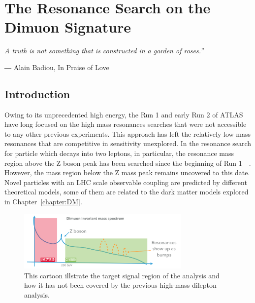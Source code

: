 \chapter{The Resonance Search on the Dimuon Signature}
\label{chapter:dimuon}

\epigraph{\textit{A truth is not something that is constructed in a garden of roses.” }}{― Alain Badiou, In Praise of Love}


\section{Introduction}

Owing to its unprecedented high energy, the Run 1 and early Run 2 of ATLAS have long focused on the high mass resonances searches that were not accessible to any other previous experiments. This approach has left the relatively low mass resonances that are competitive in sensitivity unexplored. In the resonance search for particle which decays into two leptons, in particular, the resonance mass region above the Z boson peak has been searched since the beginning of Run
1~\cite{Aaboud:2273892}~\cite{Dilepton2019}. However, the mass region below the Z mass peak remains uncovered to this date. Novel particles with an LHC scale observable coupling are predicted by different theoretical models, some of them are related to the dark matter models explored in Chapter~\ref{chapter:DM}.

\begin{figure}[!htb]
    \begin{center}
        \includegraphics[width=0.75\textwidth]{figures/chapter_dimuon/dimuonStudies}        
        \caption{
        This cartoon illstrate the target signal region of the analysis and how it has not been covered by the previous high-mass dilepton analysis. }
            \label{fig:dimuonstudies}
    \end{center}
\end{figure}
\FloatBarrier
   
